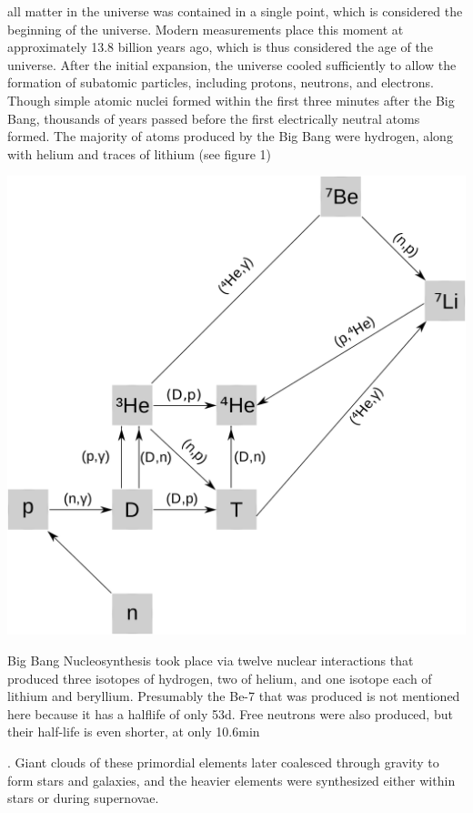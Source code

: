 \documentclass{tufte-handout}
\begin{document}
all matter in the universe was contained in a single point, which is considered the beginning of the universe. Modern measurements place this moment at approximately 13.8 billion years ago, which is thus considered the age of the universe. After the initial expansion, the universe cooled sufficiently to allow the formation of subatomic particles, including protons, neutrons, and electrons. Though simple atomic nuclei formed within the first three minutes after the Big Bang, thousands of years passed before the first electrically neutral atoms formed. The majority of atoms produced by the Big Bang were hydrogen, along with helium and traces of lithium (see figure 1) \begin{marginfigure} \includegraphics{nucleo_svg.png} \caption{Big Bang Nucleosynthesis took place via twelve nuclear interactions that produced three isotopes of hydrogen, two of helium, and one isotope each of lithium and beryllium. Presumably the Be-7 that was produced is not mentioned here because it has a halflife of only 53d. Free neutrons were also produced, but their half-life is even shorter, at only 10.6min} \end{marginfigure}. Giant clouds of these primordial elements later coalesced through gravity to form stars and galaxies, and the heavier elements were synthesized either within stars or during supernovae.
 
\end{document}
